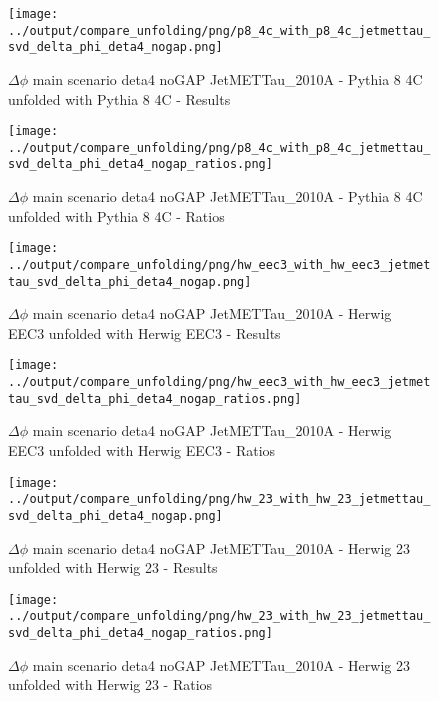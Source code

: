 \documentclass[11pt]{book}
\begin{document}
\begin{figure}[ht]
\centering
\texttt{[image: ../output/compare\_unfolding/png/p8\_4c\_with\_p8\_4c\_jetmettau\_svd\_delta\_phi\_deta4\_nogap.png]}
\caption{$\Delta\phi$ main scenario deta4 noGAP JetMETTau\_2010A - Pythia 8 4C unfolded with Pythia 8 4C - Results}
\label{p8_p8_jetmettau_svd_delta_phi_deta4_nogap_a}
\end{figure}

\begin{figure}[ht]
\centering
\texttt{[image: ../output/compare\_unfolding/png/p8\_4c\_with\_p8\_4c\_jetmettau\_svd\_delta\_phi\_deta4\_nogap\_ratios.png]}
\caption{$\Delta\phi$ main scenario deta4 noGAP JetMETTau\_2010A - Pythia 8 4C unfolded with Pythia 8 4C - Ratios}
\label{p8_p8_jetmettau_svd_delta_phi_deta4_nogap_b}
\end{figure}

\begin{figure}[ht]
\centering
\texttt{[image: ../output/compare\_unfolding/png/hw\_eec3\_with\_hw\_eec3\_jetmettau\_svd\_delta\_phi\_deta4\_nogap.png]}
\caption{$\Delta\phi$ main scenario deta4 noGAP JetMETTau\_2010A - Herwig EEC3 unfolded with Herwig EEC3 - Results}
\label{hw_eec3_hw_eec3_jetmettau_svd_delta_phi_deta4_nogap_a}
\end{figure}

\begin{figure}[ht]
\centering
\texttt{[image: ../output/compare\_unfolding/png/hw\_eec3\_with\_hw\_eec3\_jetmettau\_svd\_delta\_phi\_deta4\_nogap\_ratios.png]}
\caption{$\Delta\phi$ main scenario deta4 noGAP JetMETTau\_2010A - Herwig EEC3 unfolded with Herwig EEC3 - Ratios}
\label{hw_eec3_hw_eec3_jetmettau_svd_delta_phi_deta4_nogap_b}
\end{figure}

\begin{figure}[ht]
\centering
\texttt{[image: ../output/compare\_unfolding/png/hw\_23\_with\_hw\_23\_jetmettau\_svd\_delta\_phi\_deta4\_nogap.png]}
\caption{$\Delta\phi$ main scenario deta4 noGAP JetMETTau\_2010A - Herwig 23 unfolded with Herwig 23 - Results}
\label{hw_23_hw_23_jetmettau_svd_delta_phi_deta4_nogap_a}
\end{figure}

\begin{figure}[ht]
\centering
\texttt{[image: ../output/compare\_unfolding/png/hw\_23\_with\_hw\_23\_jetmettau\_svd\_delta\_phi\_deta4\_nogap\_ratios.png]}
\caption{$\Delta\phi$ main scenario deta4 noGAP JetMETTau\_2010A - Herwig 23 unfolded with Herwig 23 - Ratios}
\label{hw_23_hw_23_jetmettau_svd_delta_phi_deta4_nogap_b}
\end{figure}
\end{document}
